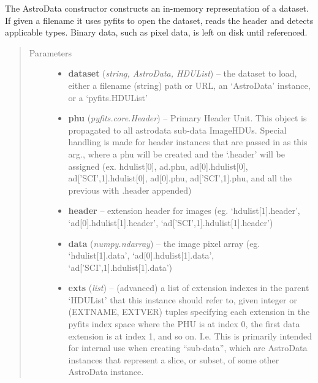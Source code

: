 \documentclass[letterpaper,10pt,english]{sphinxmanual}
\begin{document}
\begin{fulllineitems}
\label{astro_class:astrodata.AstroData}
The AstroData constructor constructs an in-memory representation of a
dataset. If given a filename it uses pyfits to open the dataset, reads
the header and detects applicable types. Binary data, such as pixel
data, is left on disk until referenced.
\begin{quote}\begin{description}
\item[{Parameters}] \leavevmode\begin{itemize}
\item {} 
\textbf{dataset} (\emph{string, AstroData, HDUList}) -- the dataset to load, either a filename (string) path
or URL, an `AstroData' instance, or a `pyfits.HDUList'

\item {} 
\textbf{phu} (\emph{pyfits.core.Header}) -- Primary Header Unit. This object is propagated to all 
astrodata sub-data ImageHDUs. Special handling is made 
for header instances that are passed in as this arg., 
where a phu will be created and the `.header' will be 
assigned (ex. hdulist{[}0{]}, ad.phu, ad{[}0{]}.hdulist{[}0{]}, 
ad{[}'SCI',1{]}.hdulist{[}0{]}, ad{[}0{]}.phu, ad{[}'SCI',1{]}.phu, 
and all the previous with .header appended)

\item {} 
\textbf{header} -- extension header for images (eg. `hdulist{[}1{]}.header',
`ad{[}0{]}.hdulist{[}1{]}.header', `ad{[}'SCI',1{]}.hdulist{[}1{]}.header')

\item {} 
\textbf{data} (\emph{numpy.ndarray}) -- the image pixel array (eg. `hdulist{[}1{]}.data',
`ad{[}0{]}.hdulist{[}1{]}.data', `ad{[}'SCI',1{]}.hdulist{[}1{]}.data')

\item {} 
\textbf{exts} (\emph{list}) -- 
(advanced) a list of extension indexes in the parent
`HDUList' that this instance should refer to, given  integer or 
(EXTNAME, EXTVER) tuples specifying each extension in the pyfits
index space where the PHU is at index 0, the first data extension
is at index 1, and so on. I.e. This is primarily intended for 
internal use when creating ``sub-data'', which are AstroData instances
that represent a slice, or subset, of some other AstroData instance.


\end{itemize}
\end{description}
\end{quote}
\end{fulllineitems}
\end{document}
